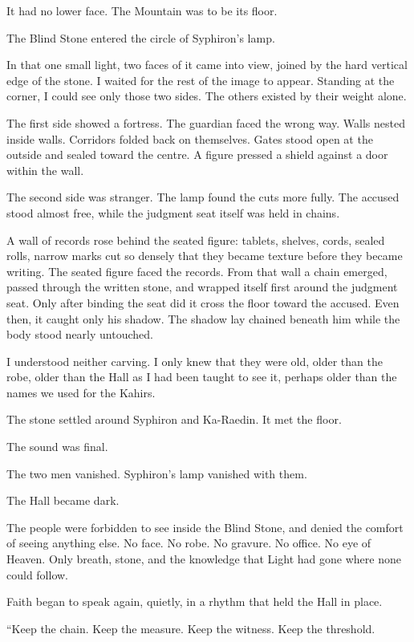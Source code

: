 It had no lower face.
The Mountain was to be its floor.\par
The Blind Stone entered the circle of Syphiron's lamp.\par
In that one small light, two faces of it came into view, joined by the hard vertical edge of the stone.
I waited for the rest of the image to appear.
Standing at the corner, I could see only those two sides.
The others existed by their weight alone.\par
The first side showed a fortress.
The guardian faced the wrong way.
Walls nested inside walls.
Corridors folded back on themselves.
Gates stood open at the outside and sealed toward the centre.
A figure pressed a shield against a door within the wall.\par
The second side was stranger.
The lamp found the cuts more fully.
The accused stood almost free, while the judgment seat itself was held in chains.\par
A wall of records rose behind the seated figure: tablets, shelves, cords, sealed rolls, narrow marks cut so densely that they became texture before they became writing.
The seated figure faced the records.
From that wall a chain emerged, passed through the written stone, and wrapped itself first around the judgment seat.
Only after binding the seat did it cross the floor toward the accused.
Even then, it caught only his shadow.
The shadow lay chained beneath him while the body stood nearly untouched.\par
I understood neither carving.
I only knew that they were old, older than the robe, older than the Hall as I had been taught to see it, perhaps older than the names we used for the Kahirs.\par
The stone settled around Syphiron and Ka-Raedin.
It met the floor.\par
The sound was final.\par
The two men vanished.
Syphiron's lamp vanished with them.\par
The Hall became dark.\par
The people were forbidden to see inside the Blind Stone, and denied the comfort of seeing anything else.
No face.
No robe.
No gravure.
No office.
No eye of Heaven.
Only breath, stone, and the knowledge that Light had gone where none could follow.\par
Faith began to speak again, quietly, in a rhythm that held the Hall in place.\par
``Keep the chain.
Keep the measure.
Keep the witness.
Keep the threshold.
